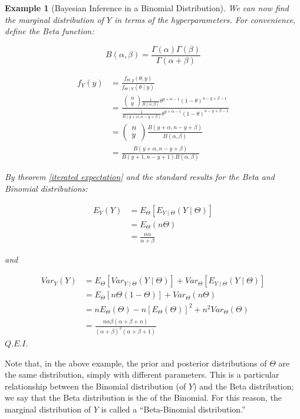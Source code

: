 \documentclass[12pt,a4paper]{article}
\newtheorem{ex}[thm]{Example}
\newcommand{\uline}[1]{\underline{\smash{#1}}}
\begin{document}
\begin{ex}[Bayesian Inference in a Binomial Distribution]
We can now find the marginal distribution of $Y$ in terms of the hyperparameters. For convenience, define the Beta function:

$$B(\alpha,\beta) = \frac{\Gamma(\alpha)\Gamma(\beta)}{\Gamma(\alpha + \beta)}$$

\begin{align*}
f_Y(y) &= \frac{f_{\Theta,y}(\theta,y)}{f_{\Theta\mid Y}(\theta \mid y)}\\
&= \frac{\left(\!\!\begin{array}{c} n\\y \end{array}\!\!\right) \frac{1}{B(\alpha,\beta)} \theta^{y+\alpha-1} (1-\theta)^{n-y+\beta-1}}{\frac{1}{B(y+\alpha,n-y+\beta)} \theta^{y+\alpha-1} (1-\theta)^{n-y+\beta -1}}\\
&= \left(\!\!\begin{array}{c} n\\y \end{array}\!\!\right) \frac{B(y+\alpha,n-y+\beta)}{B(\alpha,\beta)}\\
&= \frac{B(y+\alpha,n-y+\beta)}{B(y+1,n-y+1)B(\alpha,\beta)}
\end{align*}

By theorem \ref{iterated expectation} and the standard results for the Beta and Binomial distributions:

\begin{align*}
E_Y(Y) &= E_\Theta[E_{Y\mid \Theta}(Y\mid\Theta)]\\
&= E_\Theta(n\Theta)\\
&= \frac{n\alpha}{\alpha+\beta}
\end{align*}
\begin{center} and \end{center}
\begin{align*}
Var_Y(Y) &= E_\Theta[Var_{Y\mid\Theta}(Y\mid\Theta)] + Var_\Theta[E_{Y\mid\Theta}(Y\mid\Theta)]\\
&= E_\Theta[n\Theta(1-\Theta)] + Var_\Theta(n\Theta)\\
&= nE_\Theta(\Theta) - n[E_\Theta(\Theta)]^2 + n^2 Var_\Theta(\Theta)\\
&=  \frac{n\alpha\beta(\alpha+\beta+n)}{(\alpha+\beta)^2(\alpha+\beta+1)}
\end{align*}\hfill$Q.E.I.$

\end{ex}

Note that, in the above example, the prior and posterior distributions of $\Theta$ are the same distribution, simply with different parameters. This is a particular relationship between the Binomial distribution (of $Y$) and the Beta distribution; we say that the Beta distribution is the \uline{conjugate prior} of the Binomial. For this reason, the marginal distribution of $Y$ is called a ``Beta-Binomial distribution.''
\end{document}
